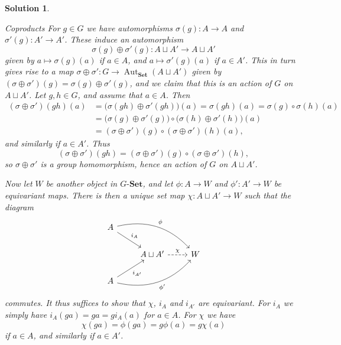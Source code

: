 \documentclass[article, a4paper, 11pt, oneside]{memoir}
\numberwithin{equation}{chapter}
\newcommand{\ncat}[1]{\mathbf{#1}} %
\newcommand{\catSet}{\ncat{Set}} %
\theoremstyle{nonumberplain}
\newtheorem{solution}{Solution}
\DeclareMathOperator{\Aut}{Aut}
\newcommand{\catGSet}[1][G]{{#1\text{-}\catSet}}
\renewcommand{\coprod}{\sqcup}
\begin{document}
\begin{solution}
\begin{proofsec}
    \item[Coproducts]
    For $g \in G$ we have automorphisms $\sigma(g) \colon A \to A$ and $\sigma'(g) \colon A' \to A'$. These induce an automorphism
    \begin{equation*}
        \sigma(g) \oplus \sigma'(g) \colon
            A \coprod A' \to A \coprod A'
    \end{equation*}
    given by $a \mapsto \sigma(g)(a)$ if $a \in A$, and $a \mapsto \sigma'(g)(a)$ if $a \in A'$. This in turn gives rise to a map $\sigma \oplus \sigma' \colon G \to \Aut_\catSet(A \coprod A')$ given by $(\sigma \oplus \sigma')(g) = \sigma(g) \oplus \sigma'(g)$, and we claim that this is an action of $G$ on $A \coprod A'$. Let $g,h \in G$, and assume that $a \in A$. Then
    \begin{align*}
        (\sigma \oplus \sigma')(gh)(a)
            &= \bigl( \sigma(gh) \oplus \sigma'(gh) \bigr)(a)
             = \sigma(gh)(a)
             = \sigma(g) \circ \sigma(h) (a) \\
            &= \bigl( \sigma(g) \oplus \sigma'(g) \bigr) \circ \bigl( \sigma(h) \oplus \sigma'(h) \bigr) (a) \\
            &= (\sigma \oplus \sigma')(g) \circ (\sigma \oplus \sigma')(h) (a),
    \end{align*}
    and similarly if $a \in A'$. Thus
    \begin{equation*}
        (\sigma \oplus \sigma')(gh)
            = (\sigma \oplus \sigma')(g) \circ (\sigma \oplus \sigma')(h),
    \end{equation*}
    so $\sigma \oplus \sigma'$ is a group homomorphism, hence an action of $G$ on $A \coprod A'$.

    Now let $W$ be another object in $\catGSet$, and let $\phi \colon A \to W$ and $\phi' \colon A' \to W$ be equivariant maps. There is then a unique set map $\chi \colon A \coprod A' \to W$ such that the diagram
    \begin{equation*}
        \begin{tikzcd}
            A
                \ar[dr, "i_A"]
                \ar[drr, "\phi", bend left] \\
            & A \coprod A'
                \ar[r, "\chi", dashed]
            & W \\
            A
                \ar[ur, "i_{A'}", swap]
                \ar[urr, "\phi'", bend right, swap]
        \end{tikzcd}
    \end{equation*}
    commutes. It thus suffices to show that $\chi$, $i_A$ and $i_{A'}$ are equivariant. For $i_A$ we simply have $i_A(ga) = ga = g i_A(a)$ for $a \in A$. For $\chi$ we have
    \begin{equation*}
        \chi(ga)
            = \phi(ga)
            = g \phi(a)
            = g \chi(a)
    \end{equation*}
    if $a \in A$, and similarly if $a \in A'$.


\end{proofsec}
\end{solution}
\end{document}
